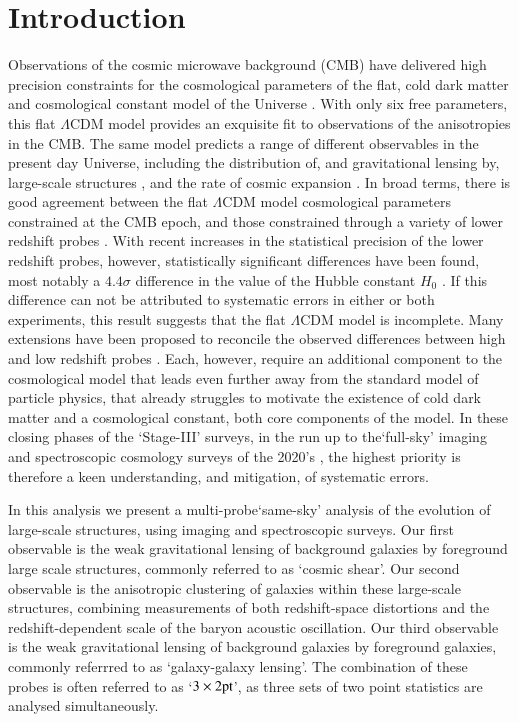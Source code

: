 \section{Introduction}
\label{sec:intro}

Observations of the cosmic microwave background (CMB) have delivered high precision
constraints for the cosmological parameters of the flat, cold dark
matter and cosmological constant model of the Universe
\citep[$\Lambda$CDM,][]{planck/etal:2018}.  With only six free
parameters, this flat $\Lambda$CDM model provides an exquisite fit to observations of
the anisotropies in the CMB.    The same model predicts a range of
different observables in the present day Universe, including the
distribution of, and gravitational lensing by, large-scale
structures \citep{peebles/1980,bartelmann/schneider:2001,eisenstein/etal:2005}, and the rate
of cosmic expansion \citep{weinberg/1972}.  In broad terms, there
is good agreement between the flat $\Lambda$CDM model cosmological parameters
constrained at the CMB epoch, and those constrained through a variety of
lower redshift probes \citep[see the discussion in][and references
therein]{planck/etal:2018}.   With recent increases in the statistical
precision of the lower redshift probes,
however, statistically significant differences have been found, most
notably a $4.4\sigma$ difference in the value of the Hubble constant
$H_0$ \citep{riess/etal:2019}.  If this difference can not be
attributed to systematic errors in either or both experiments, this result
suggests that the flat $\Lambda$CDM model is incomplete.  Many
extensions have been proposed to reconcile the observed differences between
high and low redshift probes \citep[see for
example][]{poulin/etal:2018,divalentino/etal:2020}.  Each, however, require
an additional component
to the cosmological model that leads even further away from the
standard model of particle physics, that already struggles to motivate
the existence of cold dark matter and a cosmological constant, both core
components of the model.   In these closing phases of the `Stage-III'
surveys, in the run up to the`full-sky' imaging and spectroscopic
cosmology surveys of the 2020's \citep[Euclid, VRO/LSST and DESI,][]{laureijs/etal:2011,lsst/etal:2009,DESI/etal:2016}, the highest
priority is therefore a keen understanding, and mitigation, of systematic errors.

In this analysis we present a multi-probe`same-sky' analysis of the
evolution of large-scale structures, using imaging and spectroscopic surveys.
Our first observable is the weak gravitational lensing of background
galaxies by foreground large scale
structures, commonly referred to as `cosmic shear'.    Our second
observable is the anisotropic clustering of galaxies within these
large-scale structures, combining measurements of both redshift-space
distortions and the redshift-dependent scale of the baryon acoustic
oscillation.   Our third observable is the weak gravitational lensing of background
galaxies by foreground galaxies, commonly referrred to as
`galaxy-galaxy lensing'.   The combination of these probes is
often referred to as `$3\times 2{\rm pt}$', as three sets of two point
statistics are analysed simultaneously.

